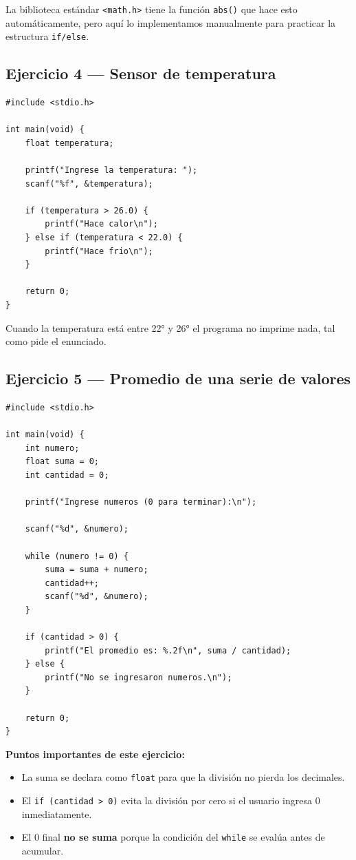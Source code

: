 \begin{notabox}
La biblioteca estándar \texttt{<math.h>} tiene la función \texttt{abs()} que hace esto automáticamente, pero aquí lo implementamos manualmente para practicar la estructura \texttt{if/else}.
\end{notabox}

\subsection{Ejercicio 4 --- Sensor de temperatura}

\begin{lstlisting}[style=estilo-c]
#include <stdio.h>

int main(void) {
    float temperatura;

    printf("Ingrese la temperatura: ");
    scanf("%f", &temperatura);

    if (temperatura > 26.0) {
        printf("Hace calor\n");
    } else if (temperatura < 22.0) {
        printf("Hace frio\n");
    }

    return 0;
}
\end{lstlisting}

\begin{notabox}
Cuando la temperatura está entre 22° y 26° el programa no imprime nada, tal como pide el enunciado.
\end{notabox}

\subsection{Ejercicio 5 --- Promedio de una serie de valores}

\begin{lstlisting}[style=estilo-c]
#include <stdio.h>

int main(void) {
    int numero;
    float suma = 0;
    int cantidad = 0;

    printf("Ingrese numeros (0 para terminar):\n");

    scanf("%d", &numero);

    while (numero != 0) {
        suma = suma + numero;
        cantidad++;
        scanf("%d", &numero);
    }

    if (cantidad > 0) {
        printf("El promedio es: %.2f\n", suma / cantidad);
    } else {
        printf("No se ingresaron numeros.\n");
    }

    return 0;
}
\end{lstlisting}

\begin{notabox}
\textbf{Puntos importantes de este ejercicio:}
\begin{itemize}
    \item La suma se declara como \texttt{float} para que la división no pierda los decimales.
    \item El \texttt{if (cantidad > 0)} evita la división por cero si el usuario ingresa 0 inmediatamente.
    \item El 0 final \textbf{no se suma} porque la condición del \texttt{while} se evalúa antes de acumular.
\end{itemize}
\end{notabox}


